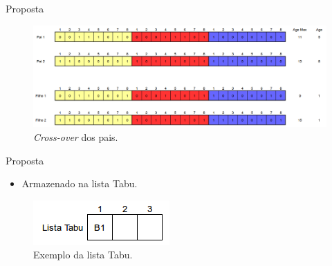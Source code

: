 \documentclass{beamer}
\begin{document}
\begin{frame}{Proposta}
\begin{figure}[h!]
\centering
\includegraphics[width=.9\textwidth]{../artigo/imagens/cross-over-pais}
\caption{\textit{Cross-over} dos pais.}
\label{fig:cross-over-pais}
\end{figure}
\end{frame}

\begin{frame}{Proposta}
	\begin{itemize}
		\item Armazenado na lista Tabu.
	\end{itemize}
\begin{figure}[h!]
\centering
\includegraphics[width=.5\textwidth]{../artigo/imagens/lista-tabu}
\caption{Exemplo da lista Tabu.}
\label{fig:lista-tabu}
\end{figure}
\end{frame}

\end{document}
